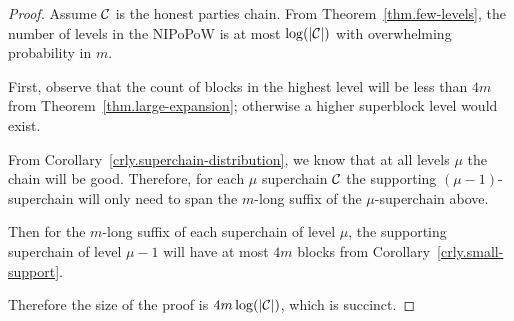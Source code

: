 \begin{proof}
    Assume $\mathcal{C}$ is the honest parties chain. From
    Theorem~\ref{thm.few-levels}, the number of levels in the NIPoPoW is at most
    $\log(|\mathcal{C}|)$ with overwhelming probability in $m$.

    First, observe that the count of blocks in the highest level will be less
    than $4m$ from Theorem~\ref{thm.large-expansion}; otherwise a higher
    superblock level would exist.

    From Corollary~\ref{crly.superchain-distribution}, we know that at all
    levels $\mu$ the chain will be good. Therefore, for each $\mu$ superchain
    $\mathcal{C}$ the supporting $(\mu - 1)$-superchain will only need to span the
    $m$-long suffix of the $\mu$-superchain above.

    Then for the $m$-long suffix of each superchain of level $\mu$, the
    supporting superchain of level $\mu - 1$ will have at most $4m$ blocks from
    Corollary~\ref{crly.small-support}.

    Therefore the size of the proof is $4m \log(|\mathcal{C}|)$, which is succinct.
\end{proof}
